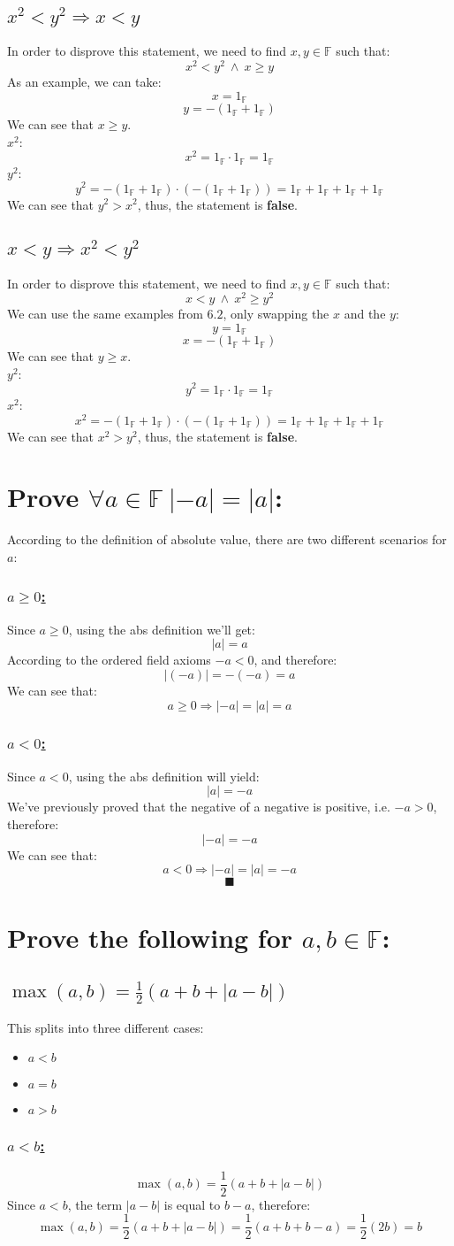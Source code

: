 \documentclass[a4paper, 12pt]{article}
\newcommand{\sub}[1]{\subsection{\underline{#1}}}
\newcommand{\subsub}[1]{\subsubsection{\underline{#1}}}
\newcommand{\?}{\stackrel{?}{=}}
\newcommand{\F}{\ensuremath{\mathbb{F}}}
\newcommand{\Onef}{\ensuremath{1_{\F}}}
\renewcommand{\qed}{$$\blacksquare$$}
\renewcommand{\b}[1]{\textbf{#1}}
\begin{document}
\sub{$ x^2<y^2 \Longrightarrow x<y $}
In order to disprove this statement, we need to find $x,y \in{\F}$ such that: $$ x^2<y^2 ~\land~ x \geq y $$
As an example, we can take: $$ x = \Onef$$ $$y=-(\Onef+\Onef) $$
We can see that $x\geq y$.\\
$x^2$: $$ x^2 = \Onef\cdot\Onef=\Onef $$
$y^2$: $$ y^2 = -(\Onef+\Onef)\cdot(-(\Onef+\Onef))=\Onef+\Onef+\Onef+\Onef $$
We can see that $y^2>x^2$, thus, the statement is \b{false}.
\pagebreak

\sub{$ x<y \Longrightarrow x^2<y^2 $}
In order to disprove this statement, we need to find $x,y \in{\F}$ such that: $$ x<y ~\land~ x^2\geq y^2 $$
We can use the same examples from $6.2$, only swapping the $x$ and the $y$: $$ y = \Onef$$ $$x=-(\Onef+\Onef) $$
We can see that $y\geq x$.\\
$y^2$: $$ y^2 = \Onef\cdot\Onef=\Onef $$
$x^2$: $$ x^2 = -(\Onef+\Onef)\cdot(-(\Onef+\Onef))=\Onef+\Onef+\Onef+\Onef $$
We can see that $x^2>y^2$, thus, the statement is \b{false}.

\section{Prove $\forall{a}\in\F~|-a|=|a|$:}
According to the definition of absolute value, there are two different scenarios for $a$:
\subsub{$a \geq 0$:}
Since $a\geq 0$, using the abs definition we'll get: $$ |a| = a $$
According to the ordered field axioms $-a < 0$, and therefore: $$|(-a)| = -(-a) = a$$
We can see that: $$a \geq 0 \Longrightarrow |-a|=|a|=a$$

\subsub{$ a<0 $:}
Since $a<0$, using the abs definition will yield: $$|a| = -a $$
We've previously proved that the negative of a negative is positive, i.e. $-a>0$, therefore:
$$ |-a| = -a $$
We can see that: $$a < 0 \Longrightarrow |-a|=|a|=-a$$
\qed\pagebreak

\section{Prove the following for $a,b\in\F$:}
\sub{$\max(a,b)=\frac{1}{2}(a+b+|a-b|)$}
This splits into three different cases:
\begin{itemize}
    \item $a<b$
    \item $a=b$
    \item $a>b$
\end{itemize}
\subsub{$a<b$:}
$$\max(a,b)=\frac{1}{2}(a+b+|a-b|)$$
Since $a<b$, the term $|a-b|$ is equal to $b-a$, therefore:
$$ \max(a,b)=\frac{1}{2}(a+b+|a-b|) = \frac{1}{2}(a+b+b-a) = \frac{1}{2}(2b) = b $$
\end{document}
